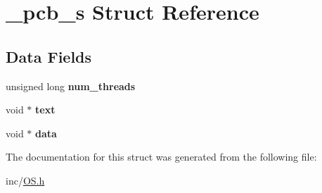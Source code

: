 \hypertarget{struct__pcb__s}{}\section{\+\_\+pcb\+\_\+s Struct Reference}
\label{struct__pcb__s}
\subsection*{Data Fields}
\begin{DoxyCompactItemize}
\item 
unsigned long {\bfseries num\+\_\+threads}\hypertarget{struct__pcb__s_a9c8ec4e7d19de58186e633e1c9a4010f}{}\label{struct__pcb__s_a9c8ec4e7d19de58186e633e1c9a4010f}

\item 
void $\ast$ {\bfseries text}\hypertarget{struct__pcb__s_ab704b53133f65b7768f5426fa4529abd}{}\label{struct__pcb__s_ab704b53133f65b7768f5426fa4529abd}

\item 
void $\ast$ {\bfseries data}\hypertarget{struct__pcb__s_a98d408faff3e9592966cee3123937713}{}\label{struct__pcb__s_a98d408faff3e9592966cee3123937713}

\end{DoxyCompactItemize}


The documentation for this struct was generated from the following file\+:\begin{DoxyCompactItemize}
\item 
inc/\hyperlink{OS_8h}{O\+S.\+h}\end{DoxyCompactItemize}
